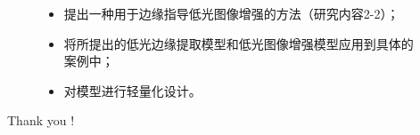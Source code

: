 \documentclass[CJK,aspectratio=169]{beamer}  %
\begin{document}
\begin{frame}
\begin{figure}
\begin{minipage}{.47\columnwidth}
\begin{itemize}
					\vspace{.3cm}
					\item[\checkmark] 
					 \yahei 提出一种用于边缘指导低光图像增强的方法（研究内容2-2）；
					
					\vspace{0.3cm}
					\item[\checkmark] 
					 \yahei 将所提出的低光边缘提取模型和低光图像增强模型应用到具体的案例中；
					
					\vspace{0.3cm}
					\item[\checkmark] 
					 \yahei 对模型进行轻量化设计。
				\end{itemize}	
			\end{minipage}
		\end{figure}
		
		
		
		
	\end{frame}
	
	\begin{frame}[plain,c]
		\begin{center}
			\Huge Thank you !
		\end{center}
	\end{frame}
	
%		
%		
	
\end{document}
